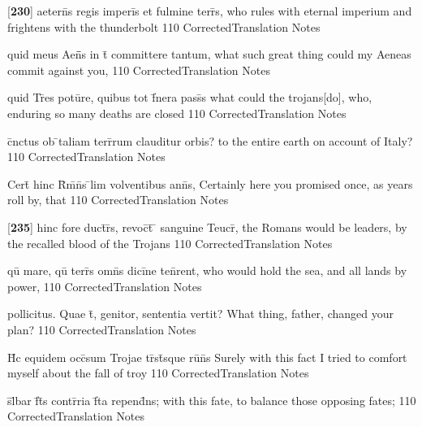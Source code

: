 \documentclass[]{book}
\begin{document}
\latline
  {[\textbf{230}] aetern\={\macron {\i}}s regis imperi\={\macron {\i}}s et fulmine terr\={}s,}
  { who rules with eternal imperium and frightens with the thunderbolt }
  {110}
  { CorrectedTranslation }
  { Notes }


\latline
  {quid meus Aen\={}\={}s in t\={} committere tantum,}
  { what such great thing could my Aeneas commit against you, }
  {110}
  { CorrectedTranslation }
  { Notes }


\latline
  {quid Tr\={}es potu\={}re, quibus tot f\={}nera pass\={\macron {\i}}s}
  { what could the trojans[do], who, enduring so many deaths are closed }
  {110}
  { CorrectedTranslation }
  { Notes }


\latline
  {c\={}nctus ob \={}taliam terr\={}rum clauditur orbis?}
  { to the entire earth on account of Italy? }
  {110}
  { CorrectedTranslation }
  { Notes }


\latline
  {Cert\={} hinc R\={}m\={}n\={}s \={}lim volventibus ann\={\macron {\i}}s,}
  { Certainly here you promised once, as years roll by, that  }
  {110}
  { CorrectedTranslation }
  { Notes }


\latline
  {[\textbf{235}] hinc fore duct\={}r\={}s, revoc\={}t\={} \={} sanguine Teucr\={\macron {\i}},}
  { the Romans would be leaders, by the recalled blood of the Trojans }
  {110}
  { CorrectedTranslation }
  { Notes }


\latline
  {qu\={\macron {\i}} mare, qu\={\macron {\i}} terr\={}s omn\={\macron {\i}}s dici\={}ne ten\={}rent,}
  { who would hold the sea, and all lands by power, }
  {110}
  { CorrectedTranslation }
  { Notes }


\latline
  {pollicitus.  Quae t\={}, genitor, sententia vertit?}
  { What thing, father, changed your plan? }
  {110}
  { CorrectedTranslation }
  { Notes }


\latline
  {H\={}c equidem occ\={}sum Trojae tr\={\macron {\i}}st\={\macron {\i}}sque ru\={\macron {\i}}n\={}s}
  { Surely with this fact I tried to comfort myself about the fall of troy }
  {110}
  { CorrectedTranslation }
  { Notes }


\latline
  {s\={}l\={}bar f\={}t\={\macron {\i}}s contr\={}ria f\={}ta repend\={}ns;}
  { with this fate, to balance those opposing fates; }
  {110}
  { CorrectedTranslation }
  { Notes }
\end{document}
